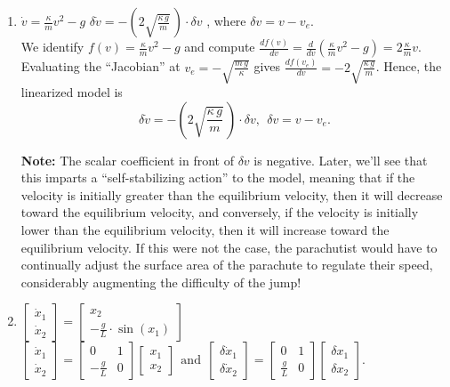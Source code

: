  \begin{enumerate}
\renewcommand{\labelenumi}{(\alph{enumi})}
\setlength{\itemsep}{.8cm}
    \item $\dot{v} =   \frac{\kappa}{m} v^2 - g$ \quad \Ans \quad $ \delta \dot{v} = -\left(2 \sqrt{\frac{\kappa \, g}{m}}\, \right) \cdot \delta v$ , where $\delta v = v-v_e$.\\

We identify $f(v)=\frac{\kappa}{m} v^2 - g$ and compute $\frac{df(v)}{dv} = \frac{d}{dv} (\frac{\kappa}{m} v^2 - g) = 2 \frac{\kappa}{m} v$. Evaluating the ``Jacobian'' at $v_e = -\sqrt{ \frac{m\,g}{\kappa} }$ gives $\frac{df(v_e)}{dv} = -2 \sqrt{\frac{\kappa \, g}{m}}$. Hence, the linearized model is
    $$ \delta \dot{v} = -\left(2 \sqrt{\frac{\kappa \, g}{m}} \, \right) \cdot \delta v,~~\delta v = v-v_e.$$
    
    \textbf{Note:} The scalar coefficient in front of $\delta v$ is negative. Later, we'll see that this imparts a ``self-stabilizing action'' to the model, meaning that if the velocity is initially greater than the equilibrium velocity, then it will decrease toward the equilibrium velocity, and conversely, if the velocity is initially lower than the equilibrium velocity, then it will increase toward the equilibrium velocity. If this were not the case, the parachutist would have to continually adjust the surface area of the parachute to regulate their speed, considerably augmenting the difficulty of the jump!
    
    \item $\left[ \begin{array}{c} \dot{x}_1 \\ \dot{x}_2 \end{array} \right]= \left[\begin{array}{c} x_2 \\  -\frac{g}{L}  \cdot \sin(x_1)\end{array} \right]$ \quad  \Ans \quad $\left[ \begin{array}{c} \dot{x}_1 \\ \dot{x}_2 \end{array} \right] =  \left[\begin{array}{cc} 0 & 1 \\  -\frac{g}{L} & 0\end{array} \right] \left[ \begin{array}{c}{x}_1 \\ {x}_2 \end{array} \right]  ~~\text{and}~~
\left[ \begin{array}{c} \delta \dot{x}_1 \\ \delta \dot{x}_2 \end{array} \right] =  \left[\begin{array}{cc} 0 & 1 \\  \frac{g}{L} & 0\end{array} \right] \left[ \begin{array}{c}\delta {x}_1 \\ \delta {x}_2 \end{array} \right]$.  \\ \\


\end{enumerate}
